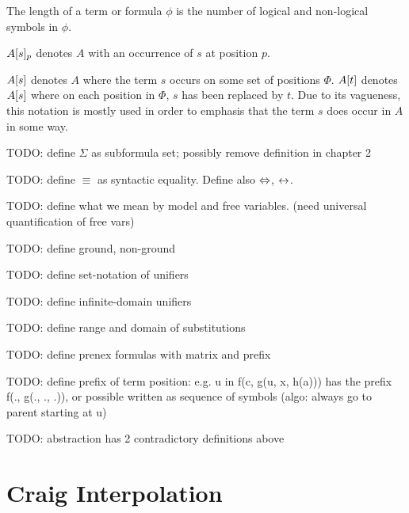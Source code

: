 The length of a term or formula $\phi$ is the number of logical and non-logical symbols in $\phi$.

$A{[s]_{p}}$ denotes $A$ with an occurrence of $s$ at position $p$.

$A[s]$ denotes $A$ where the term $s$ occurs on some set of positions $\Phi$. $A[t]$ denotes $A[s]$ where on each position in $\Phi$, $s$ has been replaced by $t$. Due to its vagueness, this notation is mostly used in order to emphasis that the term $s$ does occur in $A$ in some way.

TODO: define $\Sigma$ as subformula set; possibly remove definition in chapter 2

TODO: define $\equiv$ as syntactic equality. Define also $\operatorname{\Leftrightarrow}$, $\operatorname{\leftrightarrow}$.

TODO: define what we mean by model and free variables.
(need universal quantification of free vars)

TODO: define ground, non-ground

TODO: define set-notation of unifiers

TODO: define infinite-domain unifiers

TODO: define range and domain of substitutions

TODO: define prenex formulas with matrix and prefix

TODO: define prefix of term position: e.g. u in f(c, g(u, x, h(a))) has the prefix f(., g(., ., .)), or possible written as sequence of symbols (algo: always go to parent starting at u)

TODO: abstraction has 2 contradictory definitions above

\section{Craig Interpolation}


